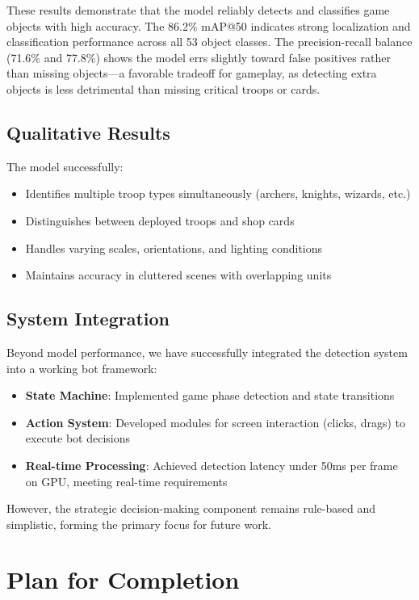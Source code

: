 \documentclass[12pt]{article}
\begin{document}
These results demonstrate that the model reliably detects and classifies game objects with high accuracy. The 86.2\% mAP@50 indicates strong localization and classification performance across all 53 object classes. The precision-recall balance (71.6\% and 77.8\%) shows the model errs slightly toward false positives rather than missing objects—a favorable tradeoff for gameplay, as detecting extra objects is less detrimental than missing critical troops or cards.

\subsection{Qualitative Results}

The model successfully:

\begin{itemize}
    \item Identifies multiple troop types simultaneously (archers, knights, wizards, etc.)
    \item Distinguishes between deployed troops and shop cards
    \item Handles varying scales, orientations, and lighting conditions
    \item Maintains accuracy in cluttered scenes with overlapping units
\end{itemize}

\subsection{System Integration}

Beyond model performance, we have successfully integrated the detection system into a working bot framework:

\begin{itemize}
    \item \textbf{State Machine}: Implemented game phase detection and state transitions
    \item \textbf{Action System}: Developed modules for screen interaction (clicks, drags) to execute bot decisions
    \item \textbf{Real-time Processing}: Achieved detection latency under 50ms per frame on GPU, meeting real-time requirements
\end{itemize}

However, the strategic decision-making component remains rule-based and simplistic, forming the primary focus for future work.

\section{Plan for Completion}
\end{document}
